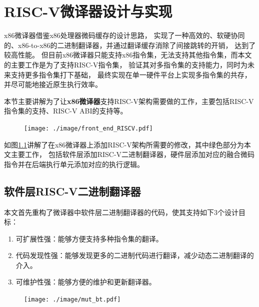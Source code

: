 \chapter{RISC-V微译器设计与实现}\label{chap:RISC-V}

x86微译器借鉴x86处理器微码缓存的设计思路，
实现了一种高效的、软硬协同的、x86-to-x86的二进制翻译器，并通过翻译缓存消除了间接跳转的开销，
达到了较高性能。
但目前x86微译器只能支持x86指令集，无法支持其他指令集，而本文的主要工作是为了支持RISC-V指令集，
验证其对多指令集的支持能力，同时为未来支持更多指令集打下基础，
最终实现在单一硬件平台上实现多指令集的共存，并尽可能地接近原生执行效率。

本节主要讲解为了让\textbf{x86微译器}支持RISC-V架构需要做的工作，主要包括RISC-V指令集的支持、RISC-V ABI的支持等。

\begin{figure}[!htbp]
  \centering
  \texttt{[image: ./image/front\_end\_RISCV.pdf]}
  \label{img:front_end_riscv}
\end{figure}

如图\ref{img:front_end_riscv}讲解了在x86微译器上添加RISC-V架构所需要的修改，其中绿色部分为本文主要工作，
包括软件层添加RISC-V二进制翻译器，硬件层添加对应的融合微码指令并在后端执行单元添加对应的执行逻辑。

\section{软件层RISC-V二进制翻译器}

本文首先重构了微译器中软件层二进制翻译器的代码，使其支持如下3个设计目标：
\begin{enumerate}
  \item 可扩展性强：能够方便支持多种指令集的翻译。
  \item 代码发现性强：能够发现更多的二进制代码进行翻译，减少动态二进制翻译的介入。
  \item 可维护性强：能够方便的维护和更新翻译器。
\end{enumerate}

\begin{figure}[!htbp]
  \centering
  \texttt{[image: ./image/mut\_bt.pdf]}
  \label{img:mut_bt}
\end{figure}

